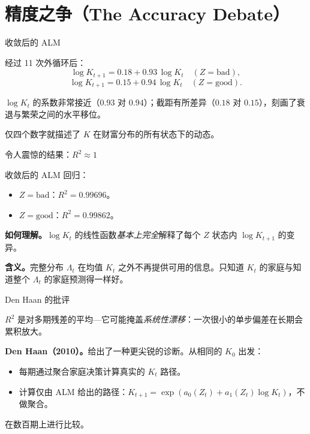 \documentclass[10pt,aspectratio=169]{beamer}
\begin{document}
\section[精度]{精度之争（The Accuracy Debate）}

\begin{frame}{收敛后的 ALM}

经过 11 次外循环后：
\[
  \log K_{t+1} = 0.18 + 0.93\, \log K_t \quad (Z = \text{bad}),
\]
\[
  \log K_{t+1} = 0.15 + 0.94\, \log K_t \quad (Z = \text{good}).
\]

\smallskip

$\log K_t$ 的系数非常接近（$0.93$ 对 $0.94$）；截距有所差异（$0.18$ 对 $0.15$），刻画了衰退与繁荣之间的水平移位。

\smallskip

仅四个数字就描述了 $K$ 在财富分布的所有状态下的动态。

\end{frame}

\begin{frame}{令人震惊的结果：$R^2 \approx 1$}

收敛后的 ALM 回归：

\begin{itemize}
  \item $Z = \text{bad}$：$R^2 = 0.99696$。
  \item $Z = \text{good}$：$R^2 = 0.99862$。
\end{itemize}

\smallskip

\textbf{如何理解。}$\log K_t$ 的线性函数\emph{基本上完全}解释了每个 $Z$ 状态内 $\log K_{t+1}$ 的变异。

\smallskip

\textbf{含义。}完整分布 $\Lambda_t$ 在均值 $K_t$ 之外不再提供可用的信息。只知道 $K_t$ 的家庭与知道整个 $\Lambda_t$ 的家庭预测得一样好。

\end{frame}

\begin{frame}{Den Haan 的批评}

$R^2$ 是对多期残差的平均---它可能掩盖\emph{系统性漂移}：一次很小的单步偏差在长期会累积放大。

\smallskip

\textbf{Den Haan（2010）。}给出了一种更尖锐的诊断。从相同的 $K_0$ 出发：

\begin{itemize}
  \item 每期通过聚合家庭决策计算真实的 $K_t$ 路径。
  \item 计算仅由 ALM 给出的路径：$K_{t+1} = \exp(a_0(Z_t) + a_1(Z_t) \log K_t)$，不做聚合。
\end{itemize}

在数百期上进行比较。

\end{frame}
\end{document}
